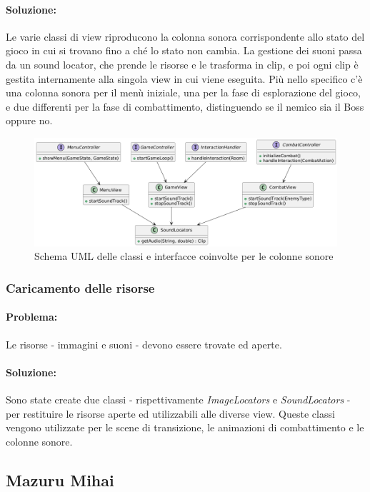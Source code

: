 \documentclass[a4paper,12pt]{report}
\begin{document}
\paragraph{Soluzione:} Le varie classi di view riproducono la colonna sonora corrispondente allo stato del gioco in cui si trovano fino a ché lo stato non cambia.
La gestione dei suoni passa da un sound locator, che prende le risorse e le trasforma in clip, e poi ogni clip è gestita internamente
alla singola view in cui viene eseguita. Più nello specifico c'è una colonna sonora per il menù iniziale, una per la fase di esplorazione del gioco, e due differenti per la fase
di combattimento, distinguendo se il nemico sia il Boss oppure no.
\begin{figure}[H]
	\centering{}
	\includegraphics[width=\textwidth]{img/lorenzo/soundtrack.png}
	\caption{Schema UML delle classi e interfacce coinvolte per le colonne sonore}
	\label{img:template}
\end{figure}

\subsubsection{Caricamento delle risorse}
\paragraph{Problema:} Le risorse - immagini e suoni - devono essere trovate ed aperte.
\paragraph{Soluzione:} Sono state create due classi - rispettivamente \textit{ImageLocators} e \textit{SoundLocators} - per restituire le risorse aperte ed utilizzabili alle 
diverse view. Queste classi vengono utilizzate per le scene di transizione, le animazioni di combattimento e le colonne sonore. 

\subsection{Mazuru Mihai}
\end{document}
